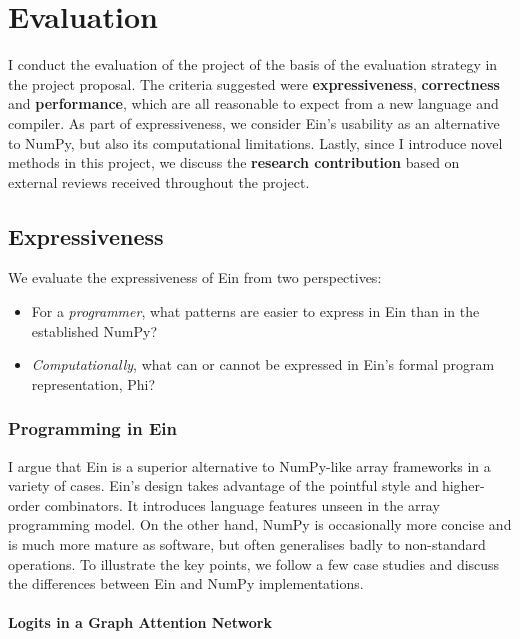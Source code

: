 \chapter{Evaluation}

I conduct the evaluation of the project of the basis of the evaluation strategy in the project proposal.
The criteria suggested were \textbf{expressiveness}, \textbf{correctness} and \textbf{performance}, which are all reasonable to expect from a new language and compiler. 
As part of expressiveness, we consider Ein's usability as an alternative to NumPy, but also its computational limitations.
Lastly, since I introduce novel methods in this project, we discuss the \textbf{research contribution} based on external reviews received throughout the project.

\section{Expressiveness}

We evaluate the expressiveness of Ein from two perspectives: \begin{itemize}
    \item For a \textit{programmer}, what patterns are easier to express in Ein than in the established NumPy?
    \item \textit{Computationally}, what can or cannot be expressed in Ein's formal program representation, Phi?
\end{itemize}

\subsection{Programming in Ein}

I argue that Ein is a superior alternative to NumPy-like array frameworks in a variety of cases. 
Ein's design takes advantage of the pointful style and higher-order combinators. 
It introduces language features unseen in the array programming model.
On the other hand, NumPy is occasionally more concise and is much more mature as software, but often generalises badly to non-standard operations. 
To illustrate the key points, we follow a few case studies and discuss the differences between Ein and NumPy implementations.

\subsubsection{Logits in a Graph Attention Network}

